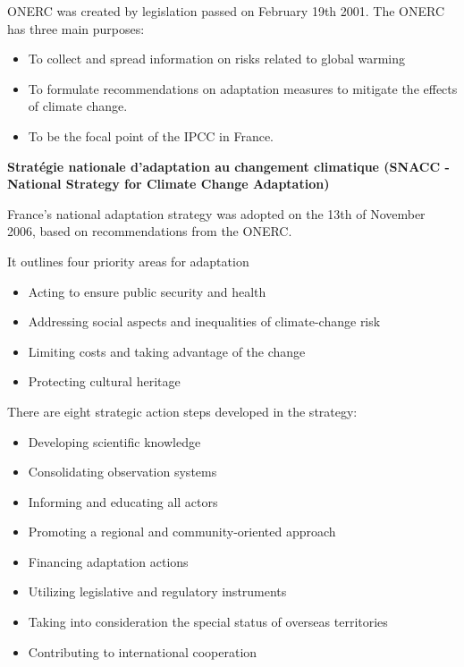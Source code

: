 ONERC was created by legislation passed on February 19th 2001. The ONERC has three main purposes:
\begin{itemize}
	\item To collect and spread information on risks related to global warming
	\item To formulate recommendations on adaptation measures to mitigate the effects of climate change.
	\item To be the focal point of the IPCC in France.
\end{itemize}



\textbf{Stratégie nationale d’adaptation au changement climatique (SNACC - National Strategy for Climate Change Adaptation)}



France's national adaptation strategy was adopted on the 13th of November 2006, based on recommendations from the ONERC. 



It outlines four priority areas for adaptation
\begin{itemize}
	\item Acting to ensure public security and health
	\item Addressing social aspects and inequalities of climate-change risk
	\item Limiting costs and taking advantage of the change
	\item Protecting cultural heritage
\end{itemize}



There are eight strategic action steps developed in the strategy:
\begin{itemize}
	\item Developing scientific knowledge
	\item Consolidating observation systems
	\item Informing and educating all actors
	\item Promoting a regional and community-oriented approach
	\item Financing adaptation actions
	\item Utilizing legislative and regulatory instruments
	\item Taking into consideration the special status of overseas territories
	\item Contributing to international cooperation
\end{itemize}



